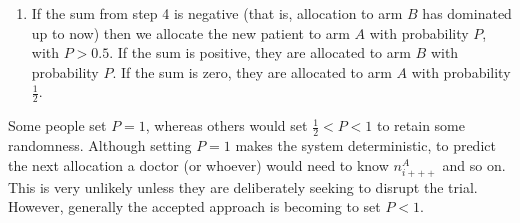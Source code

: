 \documentclass[
  openany]{book}
\providecommand{\tightlist}{%
  \setlength{\itemsep}{0pt}\setlength{\parskip}{0pt}}
\theoremstyle{definition}
\theoremstyle{definition}
\theoremstyle{definition}
\theoremstyle{definition}
\theoremstyle{remark}
\begin{document}
\begin{enumerate}
\def\labelenumi{\arabic{enumi}.}
\setcounter{enumi}{4}
\tightlist
\item
  If the sum from step 4 is negative (that is, allocation to arm \(B\) has dominated up to now) then we allocate the new patient to arm \(A\) with probability \(P\), with \(P>0.5\). If the sum is positive, they are allocated to arm \(B\) with probability \(P\). If the sum is zero, they are allocated to arm \(A\) with probability \(\frac{1}{2}\).
\end{enumerate}

Some people set \(P=1\), whereas others would set \(\frac{1}{2}<P<1\) to retain some randomness. Although setting \(P=1\) makes the system deterministic, to predict the next allocation a doctor (or whoever) would need to know \(n^A_{i+++}\) and so on. This is very unlikely unless they are deliberately seeking to disrupt the trial. However, generally the accepted approach is becoming to set \(P<1\).
\end{document}
